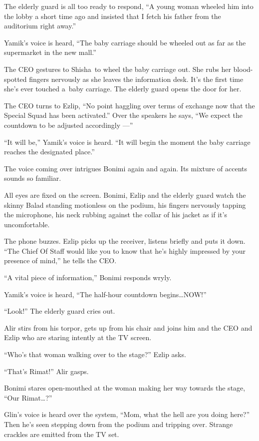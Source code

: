 \documentclass[twoside,11pt,openany]{book}
\begin{document}
The elderly guard is all too ready to respond, ``A young{ }woman
wheeled him into the lobby a short time ago and insisted that I fetch his father from the auditorium right
away.''

Yamik's voice is heard, ``The baby carriage should be wheeled out as far as the supermarket in the new
mall.''

The CEO gestures to Shisha~to wheel the baby carriage out. She rubs her blood-spotted fingers nervously as she leaves
the information desk. It's the first time she's ever touched a~baby carriage. The elderly guard opens the door for her.

The CEO turns to Ezlip, ``No point haggling over terms of exchange now that
the Special Squad has been
activated.'' Over the speakers he says,
``We expect the countdown to be adjusted accordingly ---''

``It will be,'' Yamik's voice is heard. ``It will begin the moment the baby
carriage reaches{ }the designated place.''

The voice coming over intrigues Bonimi again and again. Its mixture of accents sounds so familiar.

All eyes are fixed on the screen.{ }Bonimi, Ezlip and the elderly guard watch
the skinny Balad standing motionless on the podium, his fingers nervously tapping the microphone, his neck rubbing
against the collar of his jacket as if it{'}s uncomfortable.

The phone buzzes. Ezlip picks up the receiver, listens briefly and puts it down. ``The Chief Of Staff would
like you to know that he's highly impressed by your presence of mind,'' he tells the CEO.

``A vital piece of information,'' Bonimi responds wryly.

Yamik's voice is heard, ``The half-hour countdown
begins{\ldots}NOW!''

``Look!'' The elderly guard cries out.

Alir stirs from his torpor, gets up from his chair and joins him and the CEO and Ezlip who are staring intently at the
TV screen.

``Who's that woman walking over to the stage?'' Ezlip asks.

``That's Rimat!'' Alir gasps.

Bonimi stares open-mouthed at the woman making her way towards the stage, ``Our
Rimat{\ldots}?''

Glin's voice is heard over the system, ``Mom, what the hell are you doing here?'' Then
he's seen stepping down from the podium and tripping over. Strange crackles
are emitted from the TV set.
\end{document}
